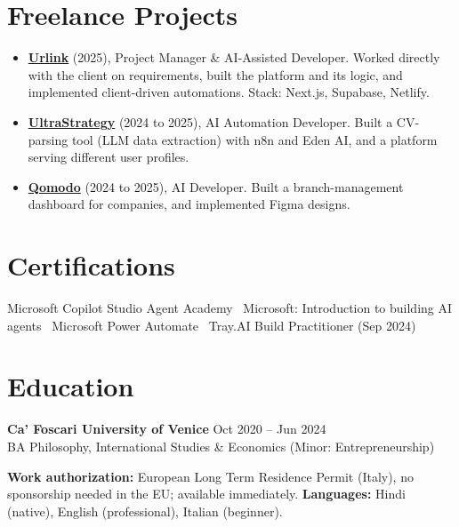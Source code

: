 \documentclass[a4paper,10pt]{article}
\begin{document}
\section{Freelance Projects}
\begin{itemize}
 \item \textbf{\href{https://smarturlink.com/}{Urlink}} (2025), Project Manager \& AI-Assisted Developer. Worked directly with the client on requirements, built the platform and its logic, and implemented client-driven automations. Stack: Next.js, Supabase, Netlify.
 \item \textbf{\href{https://ultrastrategy.com}{UltraStrategy}} (2024 to 2025), AI Automation Developer. Built a CV-parsing tool (LLM data extraction) with n8n and Eden AI, and a platform serving different user profiles.
 \item \textbf{\href{https://www.qomodo.me/}{Qomodo}} (2024 to 2025), AI Developer. Built a branch-management dashboard for companies, and implemented Figma designs.
\end{itemize}

\section{Certifications}
Microsoft Copilot Studio Agent Academy \textbullet\ Microsoft: Introduction to building AI agents \textbullet\ Microsoft Power Automate \textbullet\ Tray.AI Build Practitioner (Sep 2024)

\section{Education}
\textbf{Ca' Foscari University of Venice} \hfill Oct 2020 -- Jun 2024\\
BA Philosophy, International Studies \& Economics (Minor: Entrepreneurship)

\vspace{2pt}
{\small \textbf{Work authorization:} European Long Term Residence Permit (Italy), no sponsorship needed in the EU; available immediately. \quad \textbf{Languages:} Hindi (native), English (professional), Italian (beginner).}
\end{document}
